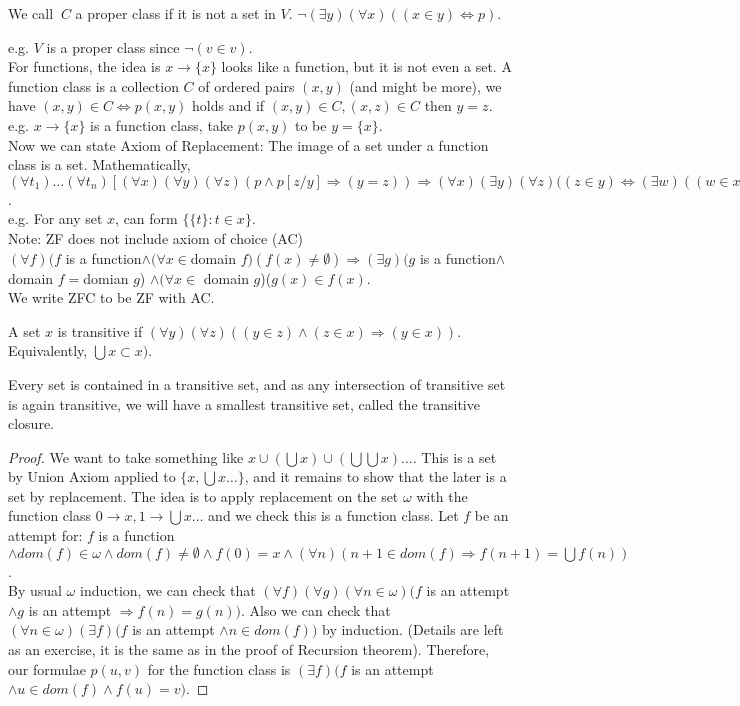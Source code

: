 \begin{definition} We call $~C$ a proper class if it is not a set in $V$.
$\neg (\exists y)(\forall x)((x \in y) \iff p)$.
\end{definition}
e.g. $V$ is a proper class since $\neg (v \in v)$.\\
For functions, the idea is $x \rightarrow \{x\}$ looks like a function, but it is not even a set. A function class is a collection $C$ of ordered pairs $(x,y)$ (and might be more), we have $(x,y) \in C \iff p(x,y)$ holds and if $(x,y) \in C, (x,z) \in C$ then $y=z$.\\
e.g. $x \rightarrow \{x\}$ is a function class, take $p(x,y)$ to be $y=\{x\}$.\\
Now we can state Axiom of Replacement: The image of a set under a function class is a set. Mathematically, $(\forall t_1) \ldots (\forall t_n)[(\forall x)(\forall y)(\forall z)(p \wedge p[z/y] \Rightarrow (y=z)) \Rightarrow (\forall x)(\exists y)(\forall z)((z \in y) \iff (\exists w)((w \in x) \wedge p[w/x,z/y])]$.\\
e.g. For any set $x$, can form $\{\{t\}: t \in x\}$.\\
Note: ZF does not include axiom of choice (AC)\\
$(\forall f)(f$ is a function$ \wedge (\forall x \in $domain $f)(f(x) \neq \emptyset) \Rightarrow (\exists g)(g$ is a function$ \wedge$ domain $f =$domian $g$) $\wedge (\forall x \in$ domain $g$)($g(x) \in f(x)$.\\
We write ZFC to be ZF with AC.
\begin{definition} A set $x$ is transitive if $(\forall y)(\forall z)((y \in z) \wedge (z \in x) \Rightarrow (y \in x))$. Equivalently, $\bigcup x \subset x)$.
\end{definition}
\begin{theorem} Every set is contained in a transitive set, and as any intersection of transitive set is again transitive, we will have a smallest transitive set, called the transitive closure.
\end{theorem}
\begin{proof} We want to take something like $x \cup (\bigcup x) \cup (\bigcup \bigcup x) \ldots$. This is a set by Union Axiom applied to $\{x, \bigcup x \ldots \}$, and it remains to show that the later is a set by replacement. The idea is to apply replacement on the set $\omega$ with the function class $0 \rightarrow x, 1 \rightarrow \bigcup x \ldots$ and we check this is a function class. Let $f$ be an attempt for: $f$ is a function $\wedge dom(f) \in \omega \wedge dom(f) \neq \emptyset \wedge f(0)=x \wedge (\forall n)(n+1 \in dom(f) \Rightarrow f(n+1)= \bigcup f(n))$.\\
By usual $\omega$ induction, we can check that $(\forall f)(\forall g)(\forall n \in \omega)(f$ is an attempt$ \wedge g$ is an attempt $\Rightarrow f(n)=g(n))$. Also we can check that $(\forall n \in \omega)(\exists f)(f$ is an attempt $\wedge n \in dom(f))$ by induction. (Details are left as an exercise, it is the same as in the proof of Recursion theorem). Therefore, our formulae $p(u,v)$ for the function class is $(\exists f)(f$ is an attempt $\wedge u \in dom(f) \wedge f(u)=v)$.
\end{proof}
